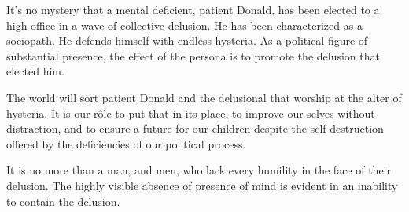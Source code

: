

It's no mystery that a mental deficient, patient Donald, has been
elected to a high office in a wave of collective delusion.  He has
been characterized as a sociopath.  He defends himself with endless
hysteria.  As a political figure of substantial presence, the effect
of the persona is to promote the delusion that elected him.

The world will sort patient Donald and the delusional that worship at
the alter of hysteria.  It is our r\^{o}le to put that in its place,
to improve our selves without distraction, and to ensure a future for
our children despite the self destruction offered by the deficiencies
of our political process.

It is no more than a man, and men, who lack every humility in the face
of their delusion.  The highly visible absence of presence of mind is
evident in an inability to contain the delusion.

\bye
